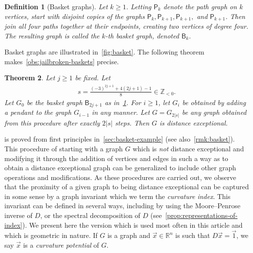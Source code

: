 \documentclass[11pt,a4paper]{article}
\newcommand{\distmatrix}{D}
\newcommand{\x}{\vec{x}}
\newcommand{\one}{\vec{1}}
\newcommand{\Path}{\mathsf{P}}
\newcommand{\Basket}{\mathsf{B}}
\newtheorem{theorem}{Theorem}[section]
\newtheorem{definition}[theorem]{Definition}
\begin{document}
    \begin{definition}[Basket graphs]\label{def:basket}
        Let $k\geq 1$. Letting $\Path_k$ denote the path graph on $k$ vertices, start with disjoint copies of the graphs $\Path_{k}, \Path_{k+1}, \Path_{k+1},$ and $\Path_{k+1}$. Then join all four paths together at their endpoints, creating two vertices of degree four. The resulting graph is called the $k$-th \emph{basket graph}, denoted $\Basket_k$.
    \end{definition}

    Basket graphs are illustrated in~\cref{fig:basket}. The following theorem makes~\cref{obs:jailbroken-baskets} precise.

    \begin{theorem}\label{thm:basket-jailbreak-intro}
        Let $j\geq 1$ be fixed. Let
            \begin{align}\label{eq:basket-iota}
                s = \frac{ (-3)^{2j+1} + 4(2j+1)-1}{8} \in\mathbb{Z}_{< 0}.
            \end{align}
        Let $G_0$ be the basket graph $\Basket_{2j+1}$ as in~\cref{def:basket}. For $i\ge 1$, let $G_{i}$ be obtained by adding a pendant to the graph $G_{i-1}$ in any manner. Let $G = G_{2|s|}$ be \emph{any} graph obtained from this procedure after exactly $2|s|$ steps. Then $G$ is distance exceptional.
    \end{theorem}
    
     is proved from first principles in~\cref{sec:basket-example} (see also~\cref{rmk:basket}). This procedure of starting with a graph $G$ which is \emph{not} distance exceptional and modifying it through the addition of vertices and edges in such a way as to obtain a distance exceptional graph can be generalized to include other graph operations and modifications. As these procedures are carried out, we observe that the proximity of a given graph to being distance exceptional can be captured in some sense by a graph invariant which we term the \emph{curvature index}. This invariant can be defined in several ways, including by using the Moore--Penrose inverse of $\distmatrix$, or the spectral decomposition of $\distmatrix$ (see~\cref{prop:representations-of-index}). We present here the version which is used most often in this article and which is geometric in nature. If $G$ is a graph and $\x\in\mathbb{R}^{n}$ is such that $\distmatrix\x = \one$, we say $\x$ is a \emph{curvature potential} of $G$.
\end{document}
